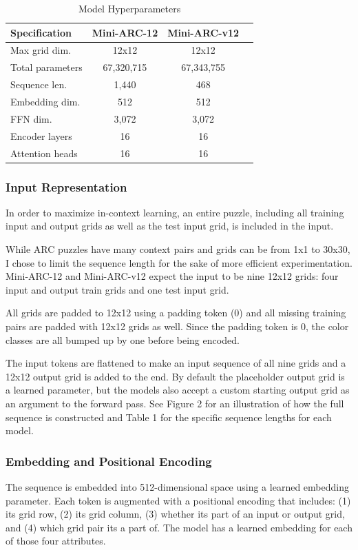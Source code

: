 \documentclass[10pt,twocolumn]{article}
\begin{document}
\begin{table}
  \centering
  \caption{Model Hyperparameters}
  \begin{tabular}{lccc}
    \toprule
    \textbf{\footnotesize{Specification}} &
    \textbf{\footnotesize{Mini-ARC-12}} &
    \textbf{\footnotesize{Mini-ARC-v12}} \\
    \midrule
    Max grid dim. & 12x12 & 12x12 \\
    Total parameters & 67,320,715 & 67,343,755  \\
    Sequence len. & 1,440 & 468 \\
    Embedding dim. & 512 & 512  \\
    FFN dim. & 3,072 & 3,072 \\
    Encoder layers & 16 & 16  \\
    Attention heads & 16 & 16 \\
    \bottomrule
  \end{tabular}
  \label{tab:model-specs}
\end{table}

\subsubsection{Input Representation}

In order to maximize in-context learning, an entire puzzle, including
all training input and output grids as well as the test input grid,
is included in the input.

While ARC puzzles have many context pairs and grids can be from 1x1
to 30x30, I chose to limit the sequence length for the sake of
more efficient experimentation. Mini-ARC-12 and Mini-ARC-v12 expect the input
to be nine 12x12 grids: four input and output train grids and one
test input grid.

All grids are padded to 12x12 using a padding token (0) and all
missing training pairs are padded with 12x12 grids as well. Since the
padding token is 0, the color classes are all bumped up by one before
being encoded.

The input tokens are flattened to make an input sequence of all nine
grids and a 12x12 output grid is added to the end. By default the
placeholder output grid is a learned parameter, but the models also
accept a custom starting output grid as an argument to the forward
pass. See Figure 2 for an illustration of how the full sequence is
constructed and Table 1 for the specific sequence lengths for each model.

\subsubsection{Embedding and Positional Encoding}
The sequence is embedded into 512-dimensional space using a
learned embedding parameter. Each token is augmented with a
positional encoding that includes: (1) its grid row, (2) its grid
column, (3) whether its part of an input or output grid, and (4)
which grid pair its a part of. The model has a learned embedding for
each of those four attributes.
\end{document}
